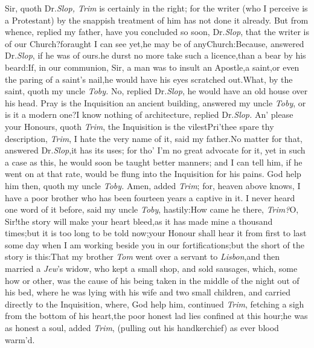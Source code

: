 \documentclass{article}
\begin{document}
Sir, quoth Dr.\@ \textit{Slop, Trim} is certainly in the right; for
the writer (who I perceive is a Protestant) by the snappish
treatment of him has not done it already. But
from whence, replied my father,\break
have you concluded so soon, Dr.\@ \textit{Slop},\break
that the writer is of our Church?\tsk for\break aught I
can see yet,\tsk he may be of any\break Church:\tsh Because,
answered Dr.\@ \textit{Slop}, if he was of ours.\tsk he durst no more
take such a licence,\tsk than a bear by his beard:\tsk If, in
our communion, Sir, a man was to insult an Apostle,\tsh a
saint,\tsh or even the paring of a saint’s
nail,\tsk he would have his eyes scratched out.\tsk What, by
the saint, quoth my
uncle \textit{Toby.} No, replied Dr.\@ \textit{Slop},\tsk
he would have an old house over his head. Pray is the Inquisition
an ancient building, answered my uncle \textit{Toby}, or is it a
modern one?\tsk I know nothing of architecture, replied
Dr.\@ \textit{Slop.}\tsh
An’ please your Honours, quoth \textit{Trim}, the Inquisition is the
vilest\tsh Pri’thee spare thy description, \textit{Trim}, I
hate the very name of it, said my father.\tsk No matter for that,
answered Dr.\@ \textit{Slop},\tsk it has its uses; for tho’
I’m no great advocate for it, yet in such a case as this, he
would soon be taught better manners; and I can tell him, if he went
on at that rate, would be flung into the Inquisition for his pains.
God help him then, quoth my uncle \textit{Toby.} Amen, added
\textit{Trim}; for, heaven above knows, I have a poor brother who has
been fourteen years a captive in it.\tsh\break
I never heard one word of it before, said
my uncle \textit{Toby}, hastily:\tsk How came he
there, \textit{Trim?}\tsh O, Sir!\@ the story will make your
heart bleed,\tsk as it has made mine a thousand times;\tsk but
it is too long to be told now;\tsh your Honour shall hear it from
first to last some day when I am working beside you in our
fortifications;\tsk but the short of the story is
this:\tsk That my brother \textit{Tom} went over a servant to
\textit{Lisbon},\tsk and then married a \textit{Jew}’s widow, who kept
a small shop, and sold sausages, which, some how or other, was the cause of
his being taken in the middle of the night out of his bed, where he
was lying with his wife and two small children, and carried
directly to the Inquisition, where, God help him, continued
\textit{Trim}, fetching a sigh from the bottom of his
heart,\tsk the poor honest lad lies confined at this
hour;\tsh\break he was
as honest a soul, added \textit{Trim}, (pulling out his handkerchief)
as ever blood warm’d.\tsh
\end{document}
